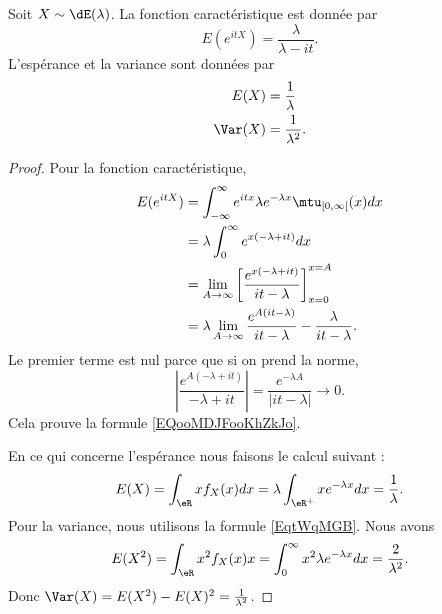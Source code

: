 \begin{proposition} \label{PropTxGcWn}
	Soit \( X\sim\dE(\lambda)\). La fonction caractéristique est donnée par
	\begin{equation}		\label{EQooMDJFooKhZkJo}
		E( e^{itX})=\frac{ \lambda }{ \lambda-it }.
	\end{equation}
	L'espérance et la variance sont données par
	\begin{equation}
		\begin{aligned}[]
			E(X)    & =\frac{1}{ \lambda }    \\
			\Var(X) & =\frac{1}{ \lambda^2 }.
		\end{aligned}
	\end{equation}
\end{proposition}

\begin{proof}
	Pour la fonction caractéristique,
	\begin{subequations}
		\begin{align}
			E( e^{itX}) & =\int_{-\infty}^{\infty} e^{it x}\lambda e^{-\lambda x}\mtu_{\mathopen\lbrack 0 , \infty \lbrack}(x)dx \\
			            & =\lambda\int_0^{\infty} e^{x(-\lambda+it)}dx                                                           \\
			            & =\lim_{A\to\infty}\left[  \frac{  e^{x(-\lambda+it)} }{ it-\lambda } \right]_{x=0}^{x=A}               \\
			            & =\lambda\lim_{A\to \infty}\frac{  e^{A(it-\lambda)} }{ it-\lambda }-\frac{\lambda}{ it-\lambda }.
		\end{align}
	\end{subequations}
	Le premier terme est nul parce que si on prend la norme,
	\begin{equation}
		\left| \frac{  e^{A(-\lambda+it)} }{ -\lambda+it } \right| =\frac{  e^{-\lambda A} }{ | it-\lambda | }\to 0.
	\end{equation}
	Cela prouve la formule \eqref{EQooMDJFooKhZkJo}.

	En ce qui concerne l'espérance nous faisons le calcul suivant :
	\begin{equation}
		E(X)=\int_{\eR}xf_X(x)dx=\lambda\int_{\eR^+}x e^{-\lambda x}dx=\frac{1}{ \lambda }.
	\end{equation}
	Pour la variance, nous utilisons la formule \eqref{EqtWqMGB}. Nous avons
	\begin{equation}
		E(X^2)=\int_{\eR}x^2f_X(x)x=\int_0^{\infty}x^2\lambda e^{-\lambda x}dx=\frac{ 2 }{ \lambda^2 }.
	\end{equation}
	Donc \( \Var(X)=E(X^2)-E(X)^2=\frac{1}{ \lambda^2 }\).
\end{proof}

